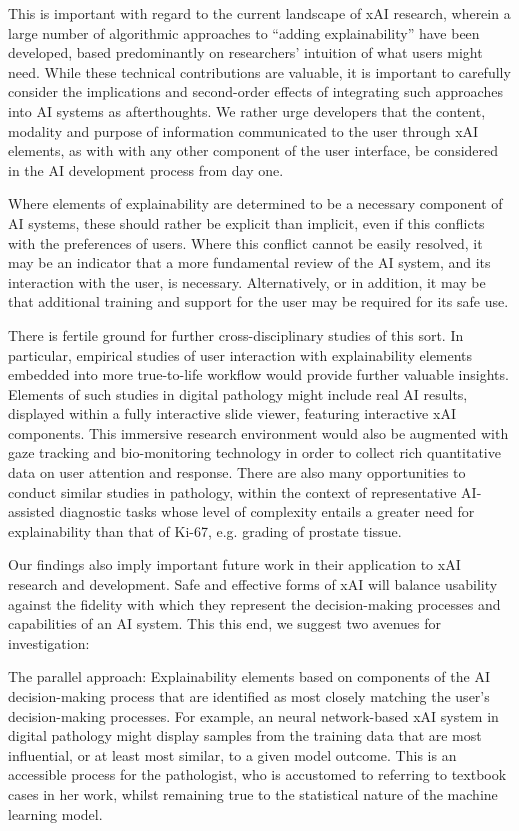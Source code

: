 \documentclass[final,5p,times,twocolumn,hyphens]{elsarticle}
\begin{document}
This is important with regard to the current landscape of xAI research, wherein a large number of algorithmic approaches to ``adding explainability'' have been developed, based predominantly on researchers' intuition of what users might need. While these technical contributions are valuable, it is important to carefully consider the implications and second-order effects of integrating such approaches into AI systems as afterthoughts. We rather urge developers that the content, modality and purpose of information communicated to the user through xAI elements, as with with any other component of the user interface, be considered in the AI development process from day one.

Where elements of explainability are determined to be a necessary component of AI systems, these should rather be explicit than implicit, even if this conflicts with the preferences of users. Where this conflict cannot be easily resolved, it may be an indicator that a more fundamental review of the AI system, and its interaction with the user, is necessary. Alternatively, or in addition, it may be that additional training and support for the user may be required for its safe use. 

There is fertile ground for further cross-disciplinary studies of this sort. In particular, empirical studies of user interaction with explainability elements embedded into more true-to-life workflow would provide further valuable insights. Elements of such studies in digital pathology might include real AI results, displayed within a fully interactive slide viewer, featuring interactive xAI components. This immersive research environment would also be augmented with gaze tracking and bio-monitoring technology in order to collect rich quantitative data on user attention and response. There are also many opportunities to conduct similar studies in pathology, within the context of representative AI-assisted diagnostic tasks whose level of complexity entails a greater need for explainability than that of Ki-67, e.g. grading of prostate tissue.

Our findings also imply important future work in their application to xAI research and development. Safe and effective forms of xAI will balance usability against the fidelity with which they represent the decision-making processes and capabilities of an AI system. This this end, we suggest two avenues for investigation:

The parallel approach: Explainability elements based on components of the AI decision-making process that are identified as most closely matching the user's decision-making processes. For example, an neural network-based xAI system in digital pathology might display samples from the training data that are most influential, or at least most similar, to a given model outcome. This is an accessible process for the pathologist, who is accustomed to referring to textbook cases in her work, whilst remaining true to the statistical nature of the machine learning model.
\end{document}
